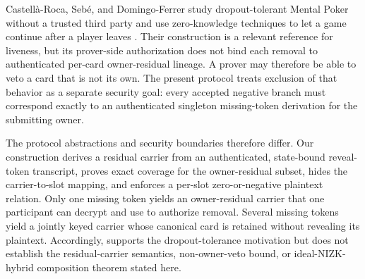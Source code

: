 \documentclass[11pt]{article}
\begin{document}
Castellà-Roca, Sebé, and Domingo-Ferrer study dropout-tolerant Mental Poker without a trusted third party and use zero-knowledge techniques to let a game continue after a player leaves \cite{ref7}. Their construction is a relevant reference for liveness, but its prover-side authorization does not bind each removal to authenticated per-card owner-residual lineage. A prover may therefore be able to veto a card that is not its own. The present protocol treats exclusion of that behavior as a separate security goal: every accepted negative branch must correspond exactly to an authenticated singleton missing-token derivation for the submitting owner.

The protocol abstractions and security boundaries therefore differ. Our construction derives a residual carrier from an authenticated, state-bound reveal-token transcript, proves exact coverage for the owner-residual subset, hides the carrier-to-slot mapping, and enforces a per-slot zero-or-negative plaintext relation. Only one missing token yields an owner-residual carrier that one participant can decrypt and use to authorize removal. Several missing tokens yield a jointly keyed carrier whose canonical card is retained without revealing its plaintext. Accordingly, \cite{ref7} supports the dropout-tolerance motivation but does not establish the residual-carrier semantics, non-owner-veto bound, or ideal-NIZK-hybrid composition theorem stated here.
\end{document}

